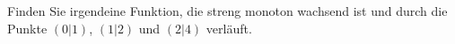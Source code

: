 \item Finden Sie irgendeine Funktion, die streng monoton wachsend ist und durch die Punkte $(0|1)$, $(1|2)$ und $(2|4)$ verläuft.

